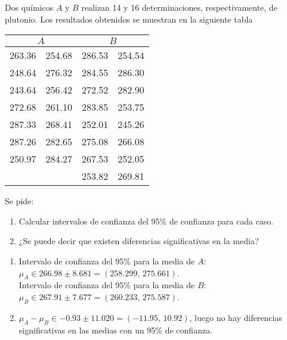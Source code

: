 {Dos químicos $A$ y $B$ realizan 14 y 16 determinaciones, respectivamente, de plutonio.
Los resultados obtenidos se muestran en la siguiente tabla
\begin{center}
\begin{tabular}{cc|cc}
\multicolumn{2}{c|}{$A$} & \multicolumn{2}{c}{$B$} \\ \hline
263.36 & 254.68 & 286.53 & 254.54 \\
248.64 & 276.32 & 284.55 & 286.30 \\
243.64 & 256.42 & 272.52 & 282.90 \\
272.68 & 261.10 & 283.85 & 253.75 \\
287.33 & 268.41 & 252.01 & 245.26 \\
287.26 & 282.65 & 275.08 & 266.08 \\
250.97 & 284.27 & 267.53 & 252.05 \\
&  & 253.82 & 269.81
\end{tabular}
\end{center}
Se pide:

\begin{enumerate}
\item Calcular intervalos de confianza del 95\% de confianza para cada caso.
\item ¿Se puede decir que existen diferencias significativas en la media?
\end{enumerate}
}
{
\begin{enumerate}
\item Intervalo de confianza del 95\% para la media de $A$: $\mu_A \in 266.98\pm 8.681 = (258.299,\,275.661)$.\\
Intervalo de confianza del 95\% para la media de $B$: $\mu_B \in 267.91\pm 7.677 = (260.233,\,275.587)$.
\item $\mu_A-\mu_B \in -0.93\pm 11.020 = (-11.95,\,10.92)$, luego no hay diferencias significativas en las medias con
un 95\% de confianza.
\end{enumerate}
}
{}


